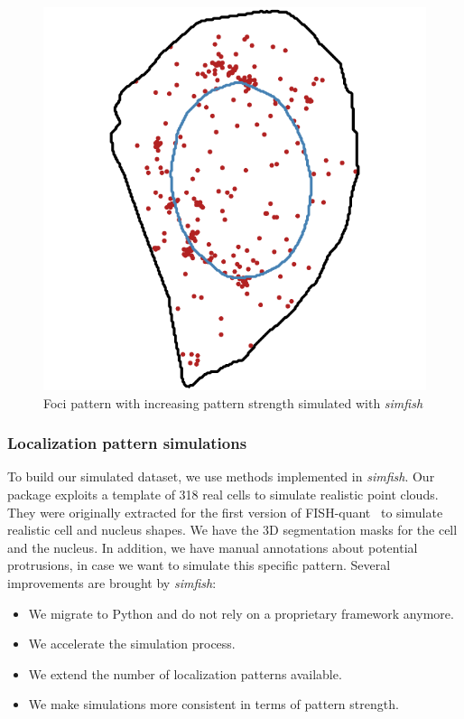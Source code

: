 \begin{figure}[h]
	\endminipage\hfill
		\includegraphics[width=\linewidth]{figures/chapter4/simulation_foci_90}
	\endminipage
	\caption{Foci pattern with increasing pattern strength simulated with \emph{simfish}}
	\label{fig:foci_panel}
\end{figure}

\subsubsection{Localization pattern simulations}

To build our simulated dataset, we use methods implemented in \emph{simfish}.
Our package exploits a template of 318 real cells to simulate realistic point clouds.
They were originally extracted for the first version of FISH-quant~\cite{samacoits_computational_2018} to simulate realistic cell and nucleus shapes.
We have the 3D segmentation masks for the cell and the nucleus.
In addition, we have manual annotations about potential protrusions, in case we want to simulate this specific pattern.
Several improvements are brought by \emph{simfish}:
\begin{itemize}
	\setlength\itemsep{0.1em}
	\item We migrate to Python and do not rely on a proprietary framework anymore.
	\item We accelerate the simulation process.
	\item We extend the number of localization patterns available.
	\item We make simulations more consistent in terms of pattern strength.
\end{itemize}

